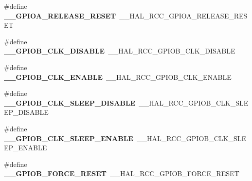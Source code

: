 \begin{DoxyCompactItemize}
\item 
\#define {\bfseries \+\_\+\+\_\+\+G\+P\+I\+O\+A\+\_\+\+R\+E\+L\+E\+A\+S\+E\+\_\+\+R\+E\+S\+ET}~\+\_\+\+\_\+\+H\+A\+L\+\_\+\+R\+C\+C\+\_\+\+G\+P\+I\+O\+A\+\_\+\+R\+E\+L\+E\+A\+S\+E\+\_\+\+R\+E\+S\+ET\hypertarget{group___h_a_l___r_c_c___aliased_ga3ee01c02d3d446f9ec7894d90803f39f}{}\label{group___h_a_l___r_c_c___aliased_ga3ee01c02d3d446f9ec7894d90803f39f}

\item 
\#define {\bfseries \+\_\+\+\_\+\+G\+P\+I\+O\+B\+\_\+\+C\+L\+K\+\_\+\+D\+I\+S\+A\+B\+LE}~\+\_\+\+\_\+\+H\+A\+L\+\_\+\+R\+C\+C\+\_\+\+G\+P\+I\+O\+B\+\_\+\+C\+L\+K\+\_\+\+D\+I\+S\+A\+B\+LE\hypertarget{group___h_a_l___r_c_c___aliased_ga239e9fd9a5eec0eea9cdd224f556b9af}{}\label{group___h_a_l___r_c_c___aliased_ga239e9fd9a5eec0eea9cdd224f556b9af}

\item 
\#define {\bfseries \+\_\+\+\_\+\+G\+P\+I\+O\+B\+\_\+\+C\+L\+K\+\_\+\+E\+N\+A\+B\+LE}~\+\_\+\+\_\+\+H\+A\+L\+\_\+\+R\+C\+C\+\_\+\+G\+P\+I\+O\+B\+\_\+\+C\+L\+K\+\_\+\+E\+N\+A\+B\+LE\hypertarget{group___h_a_l___r_c_c___aliased_ga682feb02f7018ef895fe2ffe8e595aaf}{}\label{group___h_a_l___r_c_c___aliased_ga682feb02f7018ef895fe2ffe8e595aaf}

\item 
\#define {\bfseries \+\_\+\+\_\+\+G\+P\+I\+O\+B\+\_\+\+C\+L\+K\+\_\+\+S\+L\+E\+E\+P\+\_\+\+D\+I\+S\+A\+B\+LE}~\+\_\+\+\_\+\+H\+A\+L\+\_\+\+R\+C\+C\+\_\+\+G\+P\+I\+O\+B\+\_\+\+C\+L\+K\+\_\+\+S\+L\+E\+E\+P\+\_\+\+D\+I\+S\+A\+B\+LE\hypertarget{group___h_a_l___r_c_c___aliased_ga20b3699e4c7ad29d97944199f03c3b43}{}\label{group___h_a_l___r_c_c___aliased_ga20b3699e4c7ad29d97944199f03c3b43}

\item 
\#define {\bfseries \+\_\+\+\_\+\+G\+P\+I\+O\+B\+\_\+\+C\+L\+K\+\_\+\+S\+L\+E\+E\+P\+\_\+\+E\+N\+A\+B\+LE}~\+\_\+\+\_\+\+H\+A\+L\+\_\+\+R\+C\+C\+\_\+\+G\+P\+I\+O\+B\+\_\+\+C\+L\+K\+\_\+\+S\+L\+E\+E\+P\+\_\+\+E\+N\+A\+B\+LE\hypertarget{group___h_a_l___r_c_c___aliased_ga97469fa272efddfa708b072ea1ead4d9}{}\label{group___h_a_l___r_c_c___aliased_ga97469fa272efddfa708b072ea1ead4d9}

\item 
\#define {\bfseries \+\_\+\+\_\+\+G\+P\+I\+O\+B\+\_\+\+F\+O\+R\+C\+E\+\_\+\+R\+E\+S\+ET}~\+\_\+\+\_\+\+H\+A\+L\+\_\+\+R\+C\+C\+\_\+\+G\+P\+I\+O\+B\+\_\+\+F\+O\+R\+C\+E\+\_\+\+R\+E\+S\+ET\hypertarget{group___h_a_l___r_c_c___aliased_ga990dc020ec85121fcb117c62b01e93b8}{}\label{group___h_a_l___r_c_c___aliased_ga990dc020ec85121fcb117c62b01e93b8}


\end{DoxyCompactItemize}
